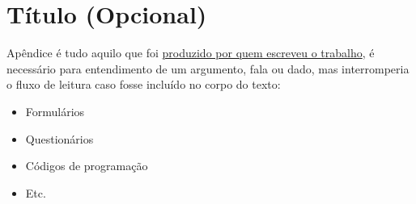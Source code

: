 \chapter{Título (Opcional)}
Apêndice é tudo aquilo que foi \underline{produzido por quem escreveu o trabalho}, é necessário para entendimento de um argumento, fala ou dado, mas interromperia o fluxo de leitura caso fosse incluído no corpo do texto:  

\begin{itemize}
    \item Formulários 
    \item Questionários 
    \item Códigos de programação 
    \item Etc.
\end{itemize}